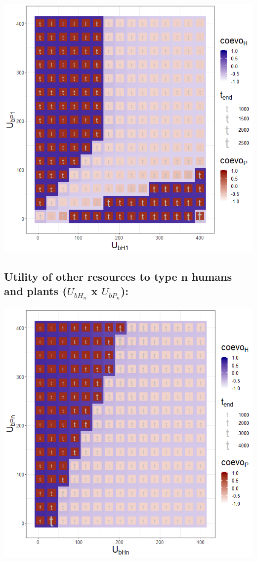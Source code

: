 \documentclass[]{book}
\begin{document}
\includegraphics[width=1\linewidth]{plots/3_twoPar-U.bH1-U.bP1_plot}

\newpage

\hypertarget{utility-of-other-resources-to-type-n-humans-and-plants-u_bh_n-x-u_bp_n}{%
\subsection{\texorpdfstring{Utility of other resources to type n humans and plants (\(U_{bH_{n}}\) x \(U_{bP_{n}}\)):}{Utility of other resources to type n humans and plants (U\_\{bH\_\{n\}\} x U\_\{bP\_\{n\}\}):}}\label{utility-of-other-resources-to-type-n-humans-and-plants-u_bh_n-x-u_bp_n}}

\includegraphics[width=1\linewidth]{plots/3_twoPar-U.bHn-U.bPn_plot}
\end{document}
